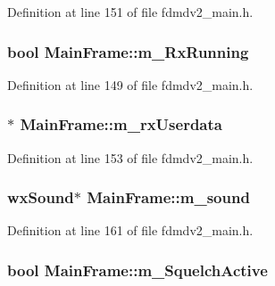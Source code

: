 Definition at line 151 of file fdmdv2\-\_\-main.\-h.

\hypertarget{class_main_frame_a6b08d2c940a180091d73ca2520eb7572}{
\subsubsection[{m\-\_\-\-Rx\-Running}]{\setlength{\rightskip}{0pt plus 5cm}bool Main\-Frame\-::m\-\_\-\-Rx\-Running}}\label{class_main_frame_a6b08d2c940a180091d73ca2520eb7572}


Definition at line 149 of file fdmdv2\-\_\-main.\-h.

\hypertarget{class_main_frame_aed30473c47c84fdc1fe39f2d21caf788}{
\subsubsection[{m\-\_\-rx\-Userdata}]{$\ast$ Main\-Frame\-::m\-\_\-rx\-Userdata}}\label{class_main_frame_aed30473c47c84fdc1fe39f2d21caf788}


Definition at line 153 of file fdmdv2\-\_\-main.\-h.

\hypertarget{class_main_frame_a6458de14647c34b3ae5ace81992710d6}{
\subsubsection[{m\-\_\-sound}]{\setlength{\rightskip}{0pt plus 5cm}wx\-Sound$\ast$ Main\-Frame\-::m\-\_\-sound}}\label{class_main_frame_a6458de14647c34b3ae5ace81992710d6}


Definition at line 161 of file fdmdv2\-\_\-main.\-h.

\hypertarget{class_main_frame_a3087b1f1ea26a408da5f7b05f37afed4}{
\subsubsection[{m\-\_\-\-Squelch\-Active}]{\setlength{\rightskip}{0pt plus 5cm}bool Main\-Frame\-::m\-\_\-\-Squelch\-Active}}\label{class_main_frame_a3087b1f1ea26a408da5f7b05f37afed4}


